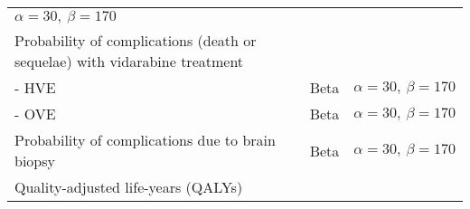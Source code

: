 \documentclass[
]{article}
\begin{document}
\begin{longtable}[]{@{}lrr@{}}
\begin{minipage}[t]{0.39\columnwidth}
\(\alpha=30, \ \beta=170\)\strut
\end{minipage}\tabularnewline
\begin{minipage}[t]{0.34\columnwidth}\raggedright
Probability of complications (death or sequelae) with vidarabine
treatment\strut
\end{minipage} & \begin{minipage}[t]{0.18\columnwidth}\raggedleft
\strut
\end{minipage} & \begin{minipage}[t]{0.39\columnwidth}\raggedleft
\strut
\end{minipage}\tabularnewline
\begin{minipage}[t]{0.34\columnwidth}\raggedright
- HVE\strut
\end{minipage} & \begin{minipage}[t]{0.18\columnwidth}\raggedleft
Beta\strut
\end{minipage} & \begin{minipage}[t]{0.39\columnwidth}\raggedleft
\(\alpha=30, \ \beta=170\)\strut
\end{minipage}\tabularnewline
\begin{minipage}[t]{0.34\columnwidth}\raggedright
- OVE\strut
\end{minipage} & \begin{minipage}[t]{0.18\columnwidth}\raggedleft
Beta\strut
\end{minipage} & \begin{minipage}[t]{0.39\columnwidth}\raggedleft
\(\alpha=30, \ \beta=170\)\strut
\end{minipage}\tabularnewline
\begin{minipage}[t]{0.34\columnwidth}\raggedright
Probability of complications due to brain biopsy\strut
\end{minipage} & \begin{minipage}[t]{0.18\columnwidth}\raggedleft
Beta\strut
\end{minipage} & \begin{minipage}[t]{0.39\columnwidth}\raggedleft
\(\alpha=30, \ \beta=170\)\strut
\end{minipage}\tabularnewline
\begin{minipage}[t]{0.34\columnwidth}\raggedright
Quality-adjusted life-years (QALYs)\strut
\end{minipage} & \begin{minipage}[t]{0.18\columnwidth}\raggedleft
\strut
\end{minipage} & \begin{minipage}[t]{0.39\columnwidth}\raggedleft

\end{minipage}
\end{longtable}
\end{document}
